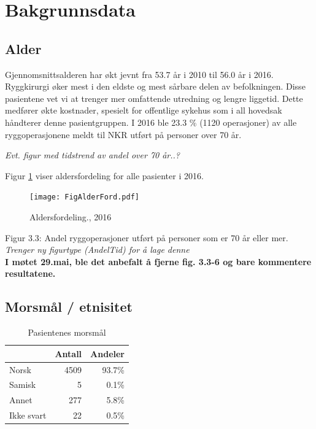 \documentclass [norsk,a4paper,twoside]{article}\usepackage[]{graphicx}\usepackage[]{color}
\begin{document}
\section{Bakgrunnsdata}
\subsection{Alder}

Gjennomsnittsalderen har økt jevnt fra 53.7 år i 2010 til 56.0 år i 2016. 
Ryggkirurgi øker mest i den eldste og mest sårbare delen av
befolkningen. Disse pasientene vet vi at trenger mer omfattende utredning og
lengre liggetid. Dette medfører økte kostnader, spesielt for offentlige sykehus som i
all hovedsak håndterer denne pasientgruppen. I 2016 ble 23.3 \% (1120 operasjoner) av alle
ryggoperasjonene meldt til NKR utført på personer over 70 år.

\textit{Evt. figur med tidstrend av andel over 70 år..?}




Figur \ref{fig:Alder} viser aldersfordeling for alle pasienter i 2016.


\begin{figure}[ht]
	\centering \texttt{[image: FigAlderFord.pdf]}
	\caption{\label{fig:Alder} Aldersfordeling., 2016}
\end{figure}






Figur 3.3: Andel ryggoperasjoner utført på personer som er 70 år eller mer.
\textit{Trenger ny figurtype (AndelTid) for å lage denne} \\
\textbf{I møtet 29.mai, ble det anbefalt å fjerne fig. 3.3-6 og bare kommentere resultatene.}


\subsection{Morsmål / etnisitet}

\begin{table}[ht]
\centering
\begin{tabular}{lrr}
  \hline
 & Antall & Andeler \\ 
  \hline
Norsk & 4509 & 93.7\% \\ 
  Samisk & 5 & 0.1\% \\ 
  Annet & 277 & 5.8\% \\ 
  Ikke svart & 22 & 0.5\% \\ 
   \hline
\end{tabular}
\caption{Pasientenes morsmål} 
\label{tab:Morsm}
\end{table}
\end{document}

